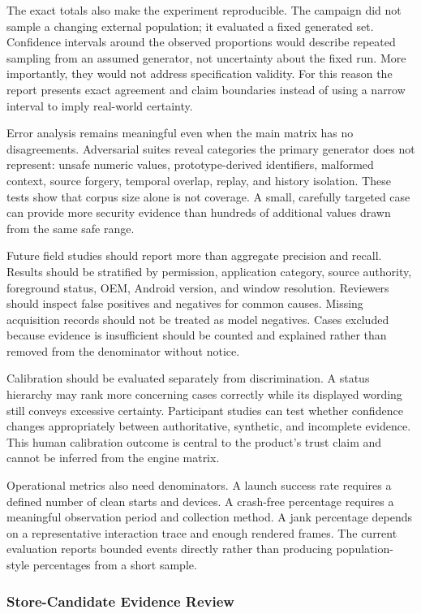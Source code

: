 The exact totals also make the experiment reproducible. The campaign did not sample a changing external population; it evaluated a fixed generated set. Confidence intervals around the observed proportions would describe repeated sampling from an assumed generator, not uncertainty about the fixed run. More importantly, they would not address specification validity. For this reason the report presents exact agreement and claim boundaries instead of using a narrow interval to imply real-world certainty.

Error analysis remains meaningful even when the main matrix has no disagreements. Adversarial suites reveal categories the primary generator does not represent: unsafe numeric values, prototype-derived identifiers, malformed context, source forgery, temporal overlap, replay, and history isolation. These tests show that corpus size alone is not coverage. A small, carefully targeted case can provide more security evidence than hundreds of additional values drawn from the same safe range.

Future field studies should report more than aggregate precision and recall. Results should be stratified by permission, application category, source authority, foreground status, OEM, Android version, and window resolution. Reviewers should inspect false positives and negatives for common causes. Missing acquisition records should not be treated as model negatives. Cases excluded because evidence is insufficient should be counted and explained rather than removed from the denominator without notice.

Calibration should be evaluated separately from discrimination. A status hierarchy may rank more concerning cases correctly while its displayed wording still conveys excessive certainty. Participant studies can test whether confidence changes appropriately between authoritative, synthetic, and incomplete evidence. This human calibration outcome is central to the product's trust claim and cannot be inferred from the engine matrix.

Operational metrics also need denominators. A launch success rate requires a defined number of clean starts and devices. A crash-free percentage requires a meaningful observation period and collection method. A jank percentage depends on a representative interaction trace and enough rendered frames. The current evaluation reports bounded events directly rather than producing population-style percentages from a short sample.

\subsubsection{Store-Candidate Evidence Review}

